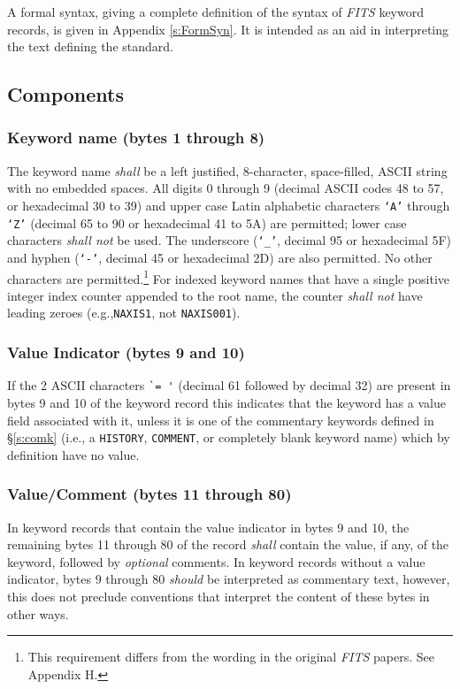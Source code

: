\documentclass[11pt,makeidx]{book}     %
\begin{document}
A formal syntax, giving a complete definition of the syntax of
{\em FITS\/} keyword records, is given in Appendix \ref{s:FormSyn}.  
It is intended as an aid in interpreting the text defining the standard.
  
   \subsection{Components}
  
   \subsubsection{Keyword name (bytes 1 through 8)}
       \label{s:keyw}
The keyword name {\em shall} be a left justified, 8-character, 
space-filled, ASCII string with no embedded spaces.  All 
digits 0 through 9 (decimal ASCII codes 48 to 57, or hexadecimal 30 to 39) and 
upper case
Latin alphabetic characters
{\tt `A'} through {\tt `Z'} (decimal 65 to 90 or hexadecimal 41 to 5A) are 
permitted; lower case characters {\em shall not} be used.  The 
underscore
({\tt `\_'}, decimal 95 or hexadecimal 5F) and 
hyphen
({\tt `-'}, decimal 45 or hexadecimal 2D) are also permitted.  No other characters
are permitted.\footnote[1]{This requirement differs from the wording in the original 
{\em FITS\/} papers.  See Appendix H.}  For indexed
keyword names that have a single 
positive integer index counter appended to the root name, the counter 
{\em shall not} have leading 
zeroes (e.g.,{\tt NAXIS1}, not {\tt NAXIS001}).


   \subsubsection{Value Indicator (bytes 9 and 10)}
   \label{s:ValInd}
   If the 2 ASCII characters \verb*+`= '+ (decimal 61 followed by decimal 32) 
   are present in bytes 9 and 10 of the
   keyword record this indicates that the keyword has a value field associated
   with it, unless it is one of the commentary 
   keywords defined in \S\ref{s:comk} 
   (i.e., a {\tt HISTORY}, {\tt COMMENT},
   or completely blank keyword name) which by definition have no value.  

   \subsubsection{Value/Comment (bytes 11 through 80)}
   \label{s:valcomm}
   In keyword records that contain the value indicator in bytes 9 and 10, the
   remaining bytes 11 through 80 of the record {\em shall} contain the value,
   if any, of the keyword, followed by {\em optional} comments.   In keyword
   records without a value indicator, bytes 9 through 80 {\em should} be
   interpreted as commentary text, however, this does not preclude conventions
   that interpret the content of these bytes in other ways.
\end{document}
